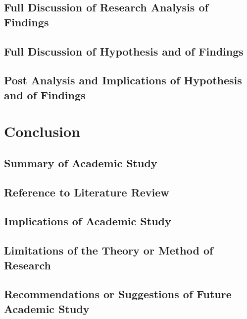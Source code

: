 \documentclass[]{article}
\begin{document}
\subsection*{Full Discussion of Research Analysis of Findings}
\subsection*{Full Discussion of Hypothesis and of Findings}
\subsection*{Post Analysis and Implications of Hypothesis and of Findings}


\section{Conclusion}


\subsection*{Summary of Academic Study}
\subsection*{Reference to Literature Review}
\subsection*{Implications of Academic Study}
\subsection*{Limitations of the Theory or Method of Research}
\subsection*{Recommendations or Suggestions of Future Academic Study}


\newpage


\end{document}
